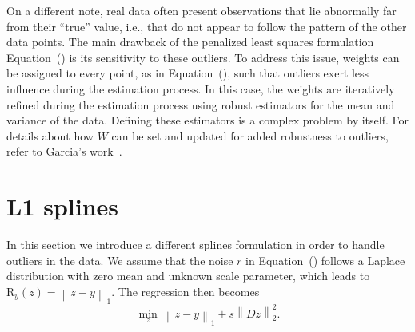 \documentclass[preprint]{imsart}
\newcommand{\funct}[1]{\mathrm{#1}}
\newcommand{\norm}[2]{\left\| #1 \right\|_{#2}}
\begin{document}
On a different note, real data often present observations that lie abnormally far from their ``true'' value, i.e., that do not appear to follow the pattern of the other data points.
The main drawback of the penalized least squares formulation Equation~() is its sensitivity to these outliers.
To address this issue, weights can be assigned to every point, as in Equation~(), such that outliers exert less influence during the estimation process.
In this case, the weights are iteratively refined during the estimation process using robust estimators for the mean and variance of the data. Defining these estimators is a complex problem by itself. For details about how $W$ can be set and updated for added robustness to outliers, refer to Garcia's work~\cite{garcia10}.



\section{L1 splines}
\label{sec:L1splines}

In this section we introduce a different splines formulation in order to handle outliers in the data. We assume that the noise $r$ in Equation~() follows a Laplace distribution with zero mean and unknown scale parameter, which leads to $\funct{R}_ y(z) = \norm{z - y}{1}$. The regression then becomes
\begin{equation}
    \min_{z} \ \norm{z - y}{1} + s \norm{Dz}{2}^2 .
    \label{eq:L1formulation}
\end{equation}
\end{document}
